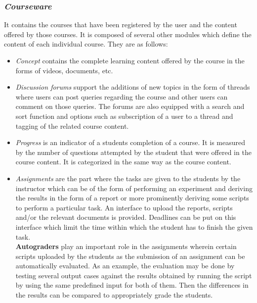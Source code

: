 \subsubsection*{\textit{Courseware}}
It contains the courses that have been registered by the user and the content offered by those courses. It is composed of several other modules which define the content of each individual course. They are as follows:
\begin{itemize}
	\item \emph{Concept} contains the complete learning content offered by the course in the forms of videos, documents, etc.
	\item \emph{Discussion forums} support the additions of new topics in the form of threads where users can post queries regarding the course and other users can comment on those queries. The forums are also equipped with a search and sort function and options such as subscription of a user to a thread and tagging of the related course content.
	\item \emph{Progress} is an indicator of a students completion of a course. It is measured by the number of questions attempted by the student that were offered in the course content. It is categorized in the same way as the course content.
	\item \emph{Assignments} are the part where the tasks are given to the students by the instructor which can be of the form of performing an experiment and deriving the results in the form of a report or more prominently deriving some scripts to perform a particular task. An interface to upload the reports, scripts and/or the relevant documents is provided. Deadlines can be put on this interface which limit the time within which the student has to finish the given task.\\
	\textbf{Autograders} play an important role in the assignments wherein certain scripts uploaded by the students as the submission of an assignment can be automatically evaluated. As an example, the evaluation may be done by testing several output cases against the results obtained by running the script by using the same predefined input for both of them. Then the differences in the results can be compared to appropriately grade the students.
\end{itemize}


